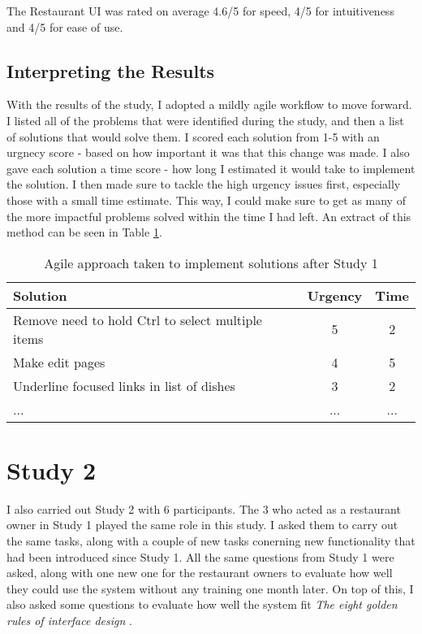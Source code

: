 The Restaurant UI was rated on average 4.6/5 for speed, 4/5 for intuitiveness and 4/5 for ease of use.

\subsection{Interpreting the Results}

With the results of the study, I adopted a mildly agile workflow to move forward. I listed all of the problems that were identified during the study, and then a list of solutions that would solve them. I scored each solution from 1-5 with an urgnecy score - based on how important it was that this change was made. I also gave each solution a time score - how long I estimated it would take to implement the solution. I then made sure to tackle the high urgency issues first, especially those with a small time estimate. This way, I could make sure to get as many of the more impactful problems solved within the time I had left. An extract of this method can be seen in Table \ref{tab:agile}.

\begin{table}[h]
\centering
\begin{tabular}{ |l|c|c| }
\hline
\textbf{Solution} & \textbf{Urgency} & \textbf{Time}\\
\hline
Remove need to hold Ctrl to select multiple items & 5 & 2 \\
\hline
Make edit pages & 4 & 5 \\
\hline
Underline focused links in list of dishes & 3 & 2 \\
\hline
... &  ... & ... \\
\hline
\end{tabular}
\caption{Agile approach taken to implement solutions after Study 1}
\label{tab:agile}
\end{table}

\section{Study 2}
\label{Study2Results}

I also carried out Study 2 with 6 participants. The 3 who acted as a restaurant owner in Study 1 played the same role in this study. I asked them to carry out the same tasks, along with a couple of new tasks conerning new functionality that had been introduced since Study 1. All the same questions from Study 1 were asked, along with one new one for the restaurant owners to evaluate how well they could use the system without any training one month later. On top of this, I also asked some questions to evaluate how well the system fit \textit{The eight golden rules of interface design} \cite{shneiderman}.

